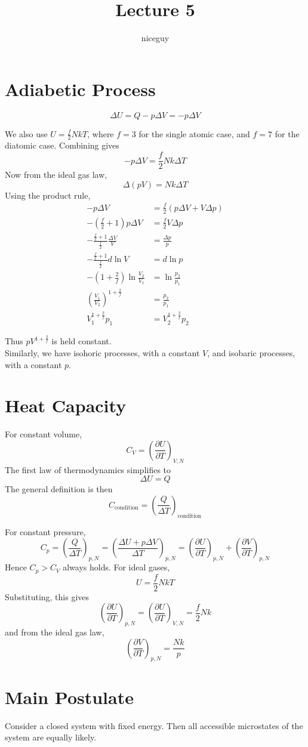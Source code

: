 \documentclass[12pt]{article}
\author{niceguy}
\title{Lecture 5}
\begin{document}
\maketitle

\section{Adiabetic Process}

$$\Delta U = Q - p\Delta V = -p\Delta V$$

We also use $U = \frac{f}{2}NkT$, where $f=3$ for the single atomic case, and $f=7$ for the diatomic case. Combining gives
$$-p\Delta V = \frac{f}{2}Nk\Delta T$$
Now from the ideal gas law,
$$\Delta(pV) = Nk\Delta T$$
Using the product rule,
\begin{align*}
	-p\Delta V &= \frac{f}{2}(p\Delta V + V\Delta p) \\
	-\left(\frac{f}{2}+1\right)p\Delta V &= \frac{f}{2}V\Delta p \\
	-\frac{\frac{f}{2}+1}{\frac{f}{2}} \frac{\Delta V}{V} &= \frac{\Delta p}{p} \\
	-\frac{\frac{f}{2}+1}{\frac{f}{2}} d\ln V &= d\ln p \\
	-\left(1+\frac{2}{f}\right)\ln\frac{V_2}{V_1} &= \ln\frac{p_2}{p_1} \\
	\left(\frac{V_1}{V_2}\right)^{1+\frac{2}{f}} &= \frac{p_2}{p_1} \\
	V_1^{1+\frac{2}{f}}p_1 &= V_2^{1+\frac{2}{f}}p_2
\end{align*}

Thus $pV^{1+\frac{2}{f}}$ is held constant. \\
Similarly, we have isohoric processes, with a constant $V$, and isobaric processes, with a constant $p$.

\section{Heat Capacity}

For constant volume,
$$C_V = \left(\frac{\partial U}{\partial T}\right)_{V,N}$$
The first law of thermodynamics simplifies to
$$\Delta U = Q$$
The general definition is then
$$C_{\text{condition}} = \left(\frac{Q}{\Delta T}\right)_{\text{condition}}$$

For constant pressure,
$$C_p = \left(\frac{Q}{\Delta T}\right)_{p,N} = \left(\frac{\Delta U + p\Delta V}{\Delta T}\right)_{p,N} = \left(\frac{\partial U}{\partial T}\right)_{p,N} + \left(\frac{\partial V}{\partial T}\right)_{p,N}$$
Hence $C_p > C_V$ always holds. For ideal gases,
$$U = \frac{f}{2}NkT$$
Substituting, this gives
$$\left(\frac{\partial U}{\partial T}\right)_{p,N} = \left(\frac{\partial U}{\partial T}\right)_{V,N} = \frac{f}{2}Nk$$
and from the ideal gas law,
$$\left(\frac{\partial V}{\partial T}\right)_{p,N} = \frac{Nk}{p}$$

\section{Main Postulate}
Consider a closed system with fixed energy. Then all accessible microstates of the system are equally likely.
\end{document}

